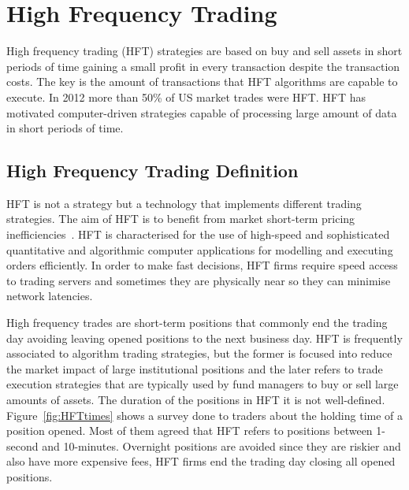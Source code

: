 \chapter{High Frequency Trading}
\label{chapter:HFT}

\vspace{0.5cm} 

High frequency trading (HFT) strategies are based on buy and sell assets in
short periods of time gaining a small profit in every transaction despite the
transaction costs. The key is the amount of transactions that HFT algorithms are
capable to execute.  In 2012 more than 50\% of US market trades were HFT.  HFT
has motivated computer-driven strategies capable of processing large amount of
data in short periods of time. 


\section{High Frequency Trading Definition}

HFT is not a strategy but a technology that implements different trading
strategies. The aim of HFT is to benefit from market short-term pricing
inefficiencies~\cite{chlistalla2011}. HFT is characterised for the use of
high-speed and sophisticated quantitative and algorithmic computer applications
for modelling and executing orders efficiently. In order to make fast decisions,
HFT firms require speed access to trading servers and sometimes they are
physically near so they can minimise network latencies.

High frequency trades are short-term positions that commonly end the trading day
avoiding leaving opened positions to the next business day. HFT is frequently
associated to algorithm trading strategies, but the former is focused into
reduce the market impact of large institutional positions and the later refers
to trade execution strategies that are typically used by fund managers to buy or
sell large amounts of assets. The duration of the positions in HFT it is not
well-defined. Figure~\ref{fig:HFTtimes} shows a survey done to traders about the
holding time of a position opened. Most of them agreed that HFT refers to
positions between 1-second and 10-minutes. Overnight positions are avoided since
they are riskier and also have more expensive fees, HFT firms end the trading
day closing all opened positions.


